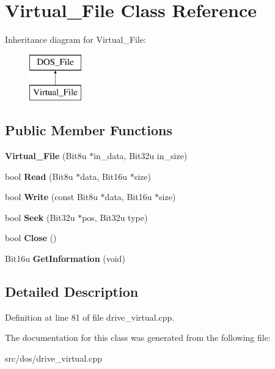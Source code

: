 \hypertarget{classVirtual__File}{\section{Virtual\-\_\-\-File Class Reference}
\label{classVirtual__File}
}
Inheritance diagram for Virtual\-\_\-\-File\-:\begin{figure}[H]
\begin{center}
\leavevmode
\includegraphics[height=2.000000cm]{classVirtual__File}
\end{center}
\end{figure}
\subsection*{Public Member Functions}
\begin{DoxyCompactItemize}
\item 
\hypertarget{classVirtual__File_a2cf61d572fa71337faaeb7df7392f317}{{\bfseries Virtual\-\_\-\-File} (Bit8u $\ast$in\-\_\-data, Bit32u in\-\_\-size)}\label{classVirtual__File_a2cf61d572fa71337faaeb7df7392f317}

\item 
\hypertarget{classVirtual__File_a1f0a1653d27e085f08eb73d6be4e1613}{bool {\bfseries Read} (Bit8u $\ast$data, Bit16u $\ast$size)}\label{classVirtual__File_a1f0a1653d27e085f08eb73d6be4e1613}

\item 
\hypertarget{classVirtual__File_a22399c468ba3dc00cec903a6620db56e}{bool {\bfseries Write} (const Bit8u $\ast$data, Bit16u $\ast$size)}\label{classVirtual__File_a22399c468ba3dc00cec903a6620db56e}

\item 
\hypertarget{classVirtual__File_ab853373156d4989afa1d293ff604146c}{bool {\bfseries Seek} (Bit32u $\ast$pos, Bit32u type)}\label{classVirtual__File_ab853373156d4989afa1d293ff604146c}

\item 
\hypertarget{classVirtual__File_a75f40f36a91d8ba716cf9d9b60bd4454}{bool {\bfseries Close} ()}\label{classVirtual__File_a75f40f36a91d8ba716cf9d9b60bd4454}

\item 
\hypertarget{classVirtual__File_a32799e96fbb1e161825303ad7ffb2a16}{Bit16u {\bfseries Get\-Information} (void)}\label{classVirtual__File_a32799e96fbb1e161825303ad7ffb2a16}

\end{DoxyCompactItemize}


\subsection{Detailed Description}


Definition at line 81 of file drive\-\_\-virtual.\-cpp.



The documentation for this class was generated from the following file\-:\begin{DoxyCompactItemize}
\item 
src/dos/drive\-\_\-virtual.\-cpp\end{DoxyCompactItemize}
